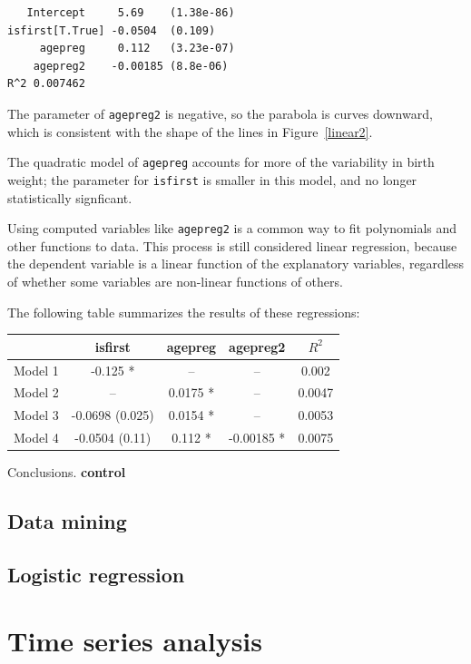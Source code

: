 \documentclass[12pt]{book}
\begin{document}
\begin{verbatim}
   Intercept	 5.69	 (1.38e-86)
isfirst[T.True]	-0.0504	 (0.109)
     agepreg	 0.112	 (3.23e-07)
    agepreg2	-0.00185 (8.8e-06)
R^2 0.007462
\end{verbatim}

The parameter of {\tt agepreg2} is negative, so the parabola is
curves downward, which is consistent with the shape of the lines
in Figure~\ref{linear2}.

The quadratic model of {\tt agepreg} accounts for more of the
variability in birth weight; the parameter for {\tt isfirst}
is smaller in this model, and no longer statistically signficant.

Using computed variables like {\tt agepreg2} is a common way to
fit polynomials and other functions to data.  
This process is still considered linear
regression, because the dependent variable is a linear function of
the explanatory variables, regardless of whether some variables
are non-linear functions of others.

The following table summarizes the results of these regressions:

\begin{center}
\begin{tabular}{|l|c|c|c|c|}
\hline & isfirst & agepreg & agepreg2 & $R^2$ \\ \hline
Model 1 & -0.125 * & -- & -- & 0.002 \\
Model 2 & -- & 0.0175 * & -- & 0.0047 \\
Model 3 & -0.0698 (0.025) & 0.0154 * & -- & 0.0053 \\
Model 4 & -0.0504 (0.11) & 0.112 * & -0.00185 * & 0.0075 \\
\hline
\end{tabular}
\end{center}

Conclusions.
{\bf control}


\section{Data mining}


\section{Logistic regression}


\chapter{Time series analysis}
\end{document}
